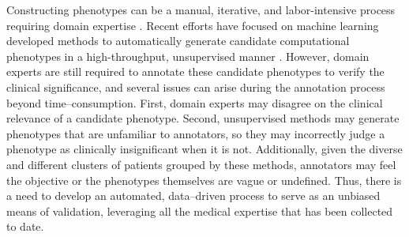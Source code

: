 \documentclass{sig-alternate-05-2015}
\begin{document}
Constructing phenotypes can be a manual, iterative, and labor-intensive process requiring domain expertise \cite{carroll2011naive,chen2013applying,hripcsak2013next}. 
Recent efforts have focused on machine learning developed methods to automatically generate candidate computational phenotypes in a high-throughput, unsupervised manner \cite{Ho:2014jc,Ho:2014da, hu2015scalable, wang2015rubik,Yu:2015fj}.
However, domain experts are still required to annotate these candidate phenotypes to verify the clinical significance, and several issues can arise during the annotation process beyond time--consumption.
First, domain experts may disagree on the clinical relevance of a candidate phenotype. 
Second, unsupervised methods may generate phenotypes that are unfamiliar to annotators, so they may incorrectly judge a phenotype as clinically insignificant when it is not.
Additionally, given the diverse and different clusters of patients grouped by these methods, annotators may feel the objective or the phenotypes themselves are vague or undefined.
Thus, there is a need to develop an automated, data--driven process to serve as an unbiased means of validation, leveraging all the medical expertise that has been collected to date.


\end{document}
